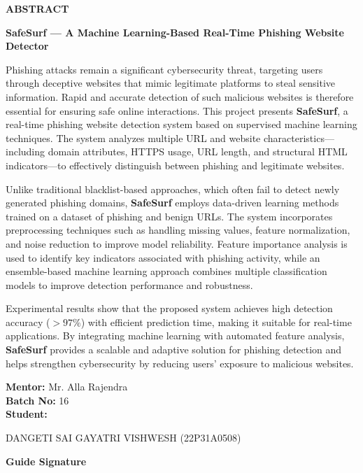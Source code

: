 \begin{center}
{\bfseries\fontsize{16}{18}\selectfont ABSTRACT}
\end{center}


\vspace{0.5cm}

\noindent
\textbf{SafeSurf — A Machine Learning-Based Real-Time Phishing Website Detector}

\vspace{0.5cm}

\noindent
Phishing attacks remain a significant cybersecurity threat, targeting users through deceptive websites that mimic legitimate platforms to steal sensitive information. Rapid and accurate detection of such malicious websites is therefore essential for ensuring safe online interactions. This project presents \textbf{SafeSurf}, a real-time phishing website detection system based on supervised machine learning techniques. The system analyzes multiple URL and website characteristics—including domain attributes, HTTPS usage, URL length, and structural HTML indicators—to effectively distinguish between phishing and legitimate websites.

\vspace{0.3cm}

\noindent
Unlike traditional blacklist-based approaches, which often fail to detect newly generated phishing domains, \textbf{SafeSurf} employs data-driven learning methods trained on a dataset of phishing and benign URLs. The system incorporates preprocessing techniques such as handling missing values, feature normalization, and noise reduction to improve model reliability. Feature importance analysis is used to identify key indicators associated with phishing activity, while an ensemble-based machine learning approach combines multiple classification models to improve detection performance and robustness.

\vspace{0.3cm}

\noindent
Experimental results show that the proposed system achieves high detection accuracy ($> 97\%$) with efficient prediction time, making it suitable for real-time applications. By integrating machine learning with automated feature analysis, \textbf{SafeSurf} provides a scalable and adaptive solution for phishing detection and helps strengthen cybersecurity by reducing users’ exposure to malicious websites.

\vspace{1cm}

\noindent
\textbf{Mentor:} Mr. Alla Rajendra\\
\textbf{Batch No:} 16\\
\textbf{Student:}

\vspace{0.2cm}

\noindent
DANGETI SAI GAYATRI VISHWESH (22P31A0508)

\vspace{1.5cm}

\begin{flushright}
\textbf{Guide Signature}
\end{flushright}